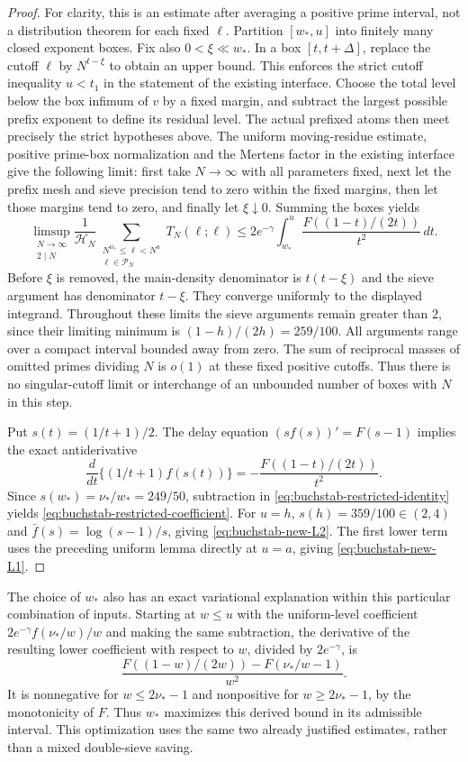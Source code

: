 \documentclass[11pt]{article}
\newcommand{\HN}{\mathcal H_N}
\begin{document}
\begin{proof}
For clarity, this is an estimate after averaging a positive
prime interval, not a distribution theorem for each fixed
$\ell$. Partition $[w_*,u]$ into finitely many closed exponent
boxes. Fix also $0<\xi\ll w_*$. In a box $[t,t+\Delta]$,
replace the cutoff $\ell$ by $N^{t-\xi}$ to obtain an upper
bound. This enforces the strict cutoff inequality $u<t_1$
in the statement of the existing interface. Choose the total level below
the box infimum of $v$ by a fixed margin, and subtract the
largest possible prefix exponent to define its residual
level. The actual prefixed atoms then meet precisely the
strict hypotheses above. The uniform moving-residue estimate,
positive prime-box normalization and the Mertens factor in
the existing interface give the following limit: first take
$N\to\infty$ with all parameters fixed, next let the prefix
mesh and sieve precision tend to zero within the fixed margins,
then let those margins tend to zero, and finally let $\xi\downarrow0$.
Summing the boxes yields
\[
 \limsup_{\substack{N\to\infty\\2\mid N}}
 \frac1{\HN}
 \sum_{\substack{N^{w_*}\le\ell<N^u\\\ell\in\mathcal P_N}}
 T_N(\ell;\ell)
 \le 2e^{-\gamma}
       \int_{w_*}^{u}\frac{F((1-t)/(2t))}{t^2}\,dt.
\]
Before $\xi$ is removed, the main-density denominator is
$t(t-\xi)$ and the sieve argument has denominator $t-\xi$.
They converge uniformly to the displayed integrand. Throughout
these limits the sieve arguments remain greater than $2$,
since their limiting minimum is $(1-h)/(2h)=259/100$.
All arguments range over a compact interval bounded away
from zero. The sum of reciprocal masses of omitted primes
dividing $N$ is $o(1)$ at these fixed positive cutoffs.
Thus there is no singular-cutoff limit or interchange of an
unbounded number of boxes with $N$ in this step.

Put $s(t)=(1/t+1)/2$. The delay equation
$(s f(s))'=F(s-1)$ implies the exact antiderivative
\[
 \frac{d}{dt}\{(1/t+1)f(s(t))\}
       =-\frac{F((1-t)/(2t))}{t^2}.
\]
Since $s(w_*)=\nu_*/w_*=249/50$, subtraction in
\eqref{eq:buchstab-restricted-identity} yields
\eqref{eq:buchstab-restricted-coefficient}.
For $u=h$, $s(h)=359/100\in(2,4)$ and
$\bar f(s)=\log(s-1)/s$, giving
\eqref{eq:buchstab-new-L2}. The first lower term uses the
preceding uniform lemma directly at $u=a$, giving
\eqref{eq:buchstab-new-L1}.
\end{proof}

The choice of $w_*$ also has an exact variational explanation
within this particular combination of inputs. Starting at
$w\le u$ with the uniform-level coefficient
$2e^{-\gamma}f(\nu_*/w)/w$ and making the same subtraction,
the derivative of the resulting lower coefficient with
respect to $w$, divided by $2e^{-\gamma}$, is
\[
 \frac{F((1-w)/(2w))-F(\nu_*/w-1)}{w^2}.
\]
It is nonnegative for $w\le2\nu_*-1$ and nonpositive for
$w\ge2\nu_*-1$, by the monotonicity of $F$.
Thus $w_*$ maximizes this derived bound in its admissible
interval. This optimization uses the same two already
justified estimates, rather than a mixed double-sieve saving.
\end{document}
